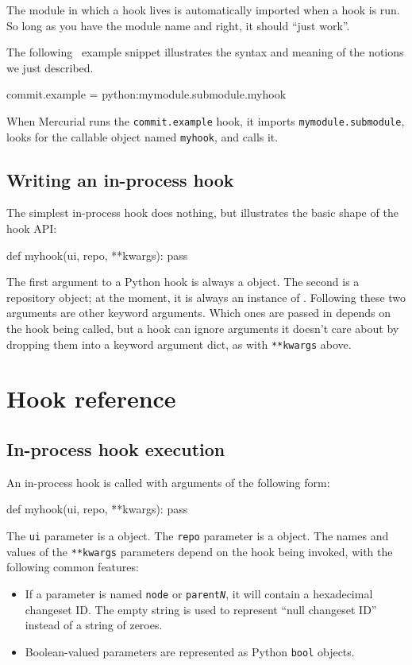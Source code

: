 The module in which a hook lives is automatically imported when a hook
is run.  So long as you have the module name and 
right, it should ``just work''.

The following \hgrc\ example snippet illustrates the syntax and
meaning of the notions we just described.
\begin{codesample2}
  [hooks]
  commit.example = python:mymodule.submodule.myhook
\end{codesample2}
When Mercurial runs the \texttt{commit.example} hook, it imports
\texttt{mymodule.submodule}, looks for the callable object named
\texttt{myhook}, and calls it.

\subsection{Writing an in-process hook}

The simplest in-process hook does nothing, but illustrates the basic
shape of the hook API:
\begin{codesample2}
  def myhook(ui, repo, **kwargs):
      pass
\end{codesample2}
The first argument to a Python hook is always a
 object.  The second is a repository object;
at the moment, it is always an instance of
.  Following these two
arguments are other keyword arguments.  Which ones are passed in
depends on the hook being called, but a hook can ignore arguments it
doesn't care about by dropping them into a keyword argument dict, as
with \texttt{**kwargs} above.

\section{Hook reference}


\subsection{In-process hook execution}

An in-process hook is called with arguments of the following form:
\begin{codesample2}
  def myhook(ui, repo, **kwargs):
      pass
\end{codesample2}
The \texttt{ui} parameter is a  object.
The \texttt{repo} parameter is a
 object.  The
names and values of the \texttt{**kwargs} parameters depend on the
hook being invoked, with the following common features:
\begin{itemize}
\item If a parameter is named \texttt{node} or
  \texttt{parent\emph{N}}, it will contain a hexadecimal changeset ID.
  The empty string is used to represent ``null changeset ID'' instead
  of a string of zeroes.
\item Boolean-valued parameters are represented as Python
  \texttt{bool} objects.
\end{itemize}

